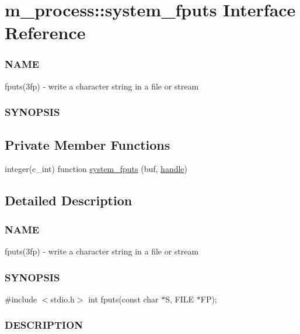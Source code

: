 \hypertarget{interfacem__process_1_1system__fputs}{}\section{m\+\_\+process\+:\+:system\+\_\+fputs Interface Reference}
\label{interfacem__process_1_1system__fputs}


\subsubsection*{N\+A\+ME}

fputs(3fp) -\/ write a character string in a file or stream \subsubsection*{S\+Y\+N\+O\+P\+S\+IS} 


\subsection*{Private Member Functions}
\begin{DoxyCompactItemize}
\item 
integer(c\+\_\+int) function \hyperlink{interfacem__process_1_1system__fputs_a0a084cac4baf5058a79af7f6490c3a89}{system\+\_\+fputs} (buf, \hyperlink{leave__watchgroup_83_8txt_ad6c5ebd26f707ef8da754021612a7c8d}{handle})
\end{DoxyCompactItemize}


\subsection{Detailed Description}
\subsubsection*{N\+A\+ME}

fputs(3fp) -\/ write a character string in a file or stream \subsubsection*{S\+Y\+N\+O\+P\+S\+IS}

\#include $<$stdio.\+h$>$ int fputs(const char $\ast$\+S, F\+I\+L\+E $\ast$\+F\+P); \subsubsection*{D\+E\+S\+C\+R\+I\+P\+T\+I\+ON}

